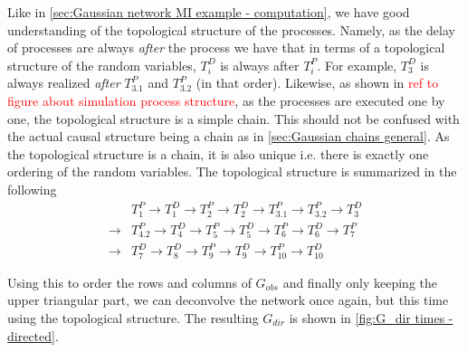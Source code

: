 \documentclass[../Thesis.tex]{subfiles}
\begin{document}
Like in \autoref{sec:Gaussian network MI example - computation}, we have good understanding of the topological structure of the processes. Namely, as the delay of processes are always \textit{after} the process we have that in terms of a topological structure of the random variables, $T^D_i$ is always after $T^P_i$. For example, $T^D_3$ is always realized \textit{after} $T^P_{3.1}$ and $T^P_{3.2}$ (in that order). Likewise, as shown in \textcolor{red}{ref to figure about simulation process structure}, as the processes are executed one by one, the topological structure is a simple chain. This should not be confused with the actual causal structure being a chain as in \autoref{sec:Gaussian chains general}. As the topological structure is a chain, it is also unique i.e. there is exactly one ordering of the random variables. The topological structure is summarized in the following
\begin{equation*}
    \begin{split}
         & T^P_{1} \longrightarrow
        T^D_{1} \longrightarrow
        T^P_{2} \longrightarrow
        T^D_{2} \longrightarrow
        T^P_{3.1} \longrightarrow
        T^P_{3.2} \longrightarrow
        T^D_{3}                      \\
        \longrightarrow
         & T^P_{4.2} \longrightarrow
        T^D_{4} \longrightarrow
        T^P_{5} \longrightarrow
        T^D_{5} \longrightarrow
        T^P_{6} \longrightarrow
        T^D_{6} \longrightarrow
        T^P_{7}                      \\
        \longrightarrow
         & T^D_{7} \longrightarrow
        T^D_{8} \longrightarrow
        T^P_{9} \longrightarrow
        T^D_{9} \longrightarrow
        T^P_{10} \longrightarrow
        T^D_{10}
    \end{split}
\end{equation*}

Using this to order the rows and columns of $G_{obs}$ and finally only keeping the upper triangular part, we can deconvolve the network once again, but this time using the topological structure. The resulting $G_{dir}$ is shown in \autoref{fig:G_dir times - directed}.
\end{document}
